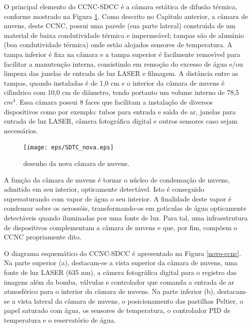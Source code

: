 O principal elemento do CCNC-SDCC \'{e} a c\^{a}mara est\'{a}tica de difus\~{a}o t\'{e}rmica, conforme mostrado na Figura \ref{SDTCnova}. Como descrito no Cap\'{\i}tulo anterior, a c\^{a}mara de nuvens, deste CCNC, possui uma parede (sua parte lateral) constru\'{\i}da de um material de baixa condutividade t\'{e}rmica e imperme\'{a}vel; tampas s\~{a}o de alum\'{\i}nio (boa condutividade t\'{e}rmica) onde est\~{a}o alojados sensores de temperatura. A tampa inferior \'{e} fixa na c\^{a}mara e a tampa superior \'{e} facilmente remov\'{\i}vel para facilitar a manuten\c{c}\~{a}o interna, consistindo em remo\c{c}\~{a}o do excesso de \'{a}gua e/ou limpeza das janelas de entrada de luz LASER e filmagem. A dist\^{a}ncia entre as tampas, quando instaladas \'{e} de 1,0 cm e o interior da c\^{a}mara de nuvens \'{e} cil\'{\i}ndrico com 10,0 cm de di\^{a}metro, tendo portanto um volume interno de 78,5 $cm^{3}$. Essa c\^{a}mara possui 8 faces que facilitam a instala\c{c}\~{a}o de diversos dispositivos como por exemplo: tubos para entrada e sa\'{\i}da de ar, janelas para entrada de luz LASER, c\^{a}mera fotogr\'{a}fica digital e outros sensores caso sejam necess\'{a}rios.

\begin{figure}[!hbt]
\begin{center}
\texttt{[image: eps/SDTC\_nova.eps]}\\
\end{center}
\caption{\label{SDTCnova}\hspace{-0.1em} desenho da nova c\^{a}mara de nuvens.}
\end{figure}

A fun\c{c}\~{a}o da c\^{a}mara de nuvens \'{e} tornar o n\'{u}cleo de condensa\c{c}\~{a}o de nuvens, admitido em seu interior, opticamente detect\'{a}vel. Isto \'{e} conseguido supersaturando com vapor de \'{a}gua o seu interior. A finalidade deste vapor \'{e} condensar sobre os aeross\'{o}is, transformando-os em got\'{\i}culas de \'{a}gua opticamente detect\'{a}veis quando iluminadas por uma fonte de luz. Para tal, uma infraestrutura de dispositivos complementam a c\^{a}mara de nuvens e que, por fim, comp\~{o}em o CCNC propriamente dito.

O diagrama esquem\'{a}tico do CCNC-SDCC \'{e} apresentado na Figura \ref{novo-ccnc}. Na parte superior (a), destacam-se a vista superior da c\^{a}mara de nuvens, uma fonte de luz LASER (635 nm), a c\^{a}mera fotogr\'{a}fica digital para o registro das imagens al\'{e}m da bomba, v\'{a}lvulas e controlador que comanda a entrada de ar atmosf\'{e}rico para o interior da c\^{a}mara de nuvens. Na parte inferior (b), destacam-se a vista lateral da c\^{a}mara de nuvens, o posicionamento das pastilhas Peltier, o papel saturado com \'{a}gua, os sensores de temperatura, o controlador PID de temperatura e o reservat\'{o}rio de \'{a}gua.

